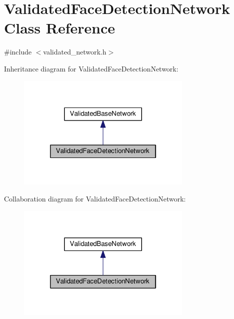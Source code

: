 \hypertarget{classValidatedFaceDetectionNetwork}{}\section{Validated\+Face\+Detection\+Network Class Reference}
\label{classValidatedFaceDetectionNetwork}


{\ttfamily \#include $<$validated\+\_\+network.\+h$>$}



Inheritance diagram for Validated\+Face\+Detection\+Network\+:
\nopagebreak
\begin{figure}[H]
\begin{center}
\leavevmode
\includegraphics[width=238pt]{classValidatedFaceDetectionNetwork__inherit__graph}
\end{center}
\end{figure}


Collaboration diagram for Validated\+Face\+Detection\+Network\+:
\nopagebreak
\begin{figure}[H]
\begin{center}
\leavevmode
\includegraphics[width=238pt]{classValidatedFaceDetectionNetwork__coll__graph}
\end{center}
\end{figure}
